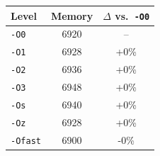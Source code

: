\begin{tabular*}{\columnwidth}{@{\extracolsep\fill}lcc@{\extracolsep\fill}}
\toprule
\textbf{Level} & \textbf{Memory} & \textbf{$\Delta$ vs.\ \texttt{-O0}} \\
\midrule
\texttt{-O0} & 6920 & -- \\
\texttt{-O1} & 6928 & +0\% \\
\texttt{-O2} & 6936 & +0\% \\
\texttt{-O3} & 6948 & +0\% \\
\texttt{-Os} & 6940 & +0\% \\
\texttt{-Oz} & 6928 & +0\% \\
\texttt{-Ofast} & 6900 & -0\% \\
\bottomrule
\end{tabular*}
